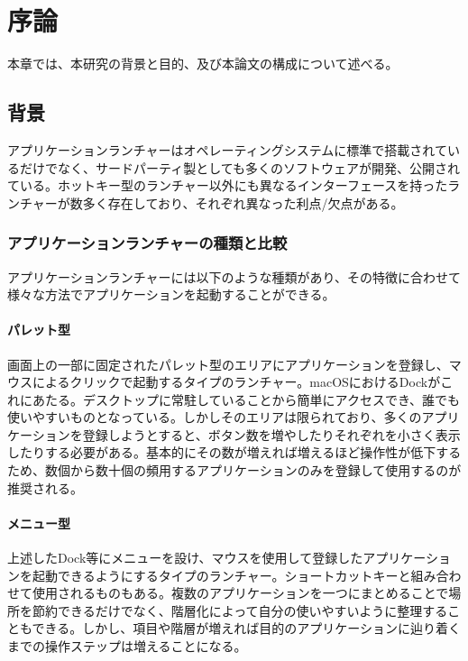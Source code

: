 \chapter{序論}
\label{chap:introduction}

本章では、本研究の背景と目的、及び本論文の構成について述べる。

\newpage

\section{背景}

アプリケーションランチャーはオペレーティングシステムに標準で搭載されているだけでなく、サードパーティ製としても多くのソフトウェアが開発、公開されている。ホットキー型のランチャー以外にも異なるインターフェースを持ったランチャーが数多く存在しており、それぞれ異なった利点/欠点がある。

\subsection{アプリケーションランチャーの種類と比較}

アプリケーションランチャーには以下のような種類があり、その特徴に合わせて様々な方法でアプリケーションを起動することができる。

\subsubsection{パレット型}

画面上の一部に固定されたパレット型のエリアにアプリケーションを登録し、マウスによるクリックで起動するタイプのランチャー。macOSにおけるDockがこれにあたる。デスクトップに常駐していることから簡単にアクセスでき、誰でも使いやすいものとなっている。しかしそのエリアは限られており、多くのアプリケーションを登録しようとすると、ボタン数を増やしたりそれぞれを小さく表示したりする必要がある。基本的にその数が増えれば増えるほど操作性が低下するため、数個から数十個の頻用するアプリケーションのみを登録して使用するのが推奨される。

\subsubsection{メニュー型}

上述したDock等にメニューを設け、マウスを使用して登録したアプリケーションを起動できるようにするタイプのランチャー。ショートカットキーと組み合わせて使用されるものもある。複数のアプリケーションを一つにまとめることで場所を節約できるだけでなく、階層化によって自分の使いやすいように整理することもできる。しかし、項目や階層が増えれば目的のアプリケーションに辿り着くまでの操作ステップは増えることになる。

